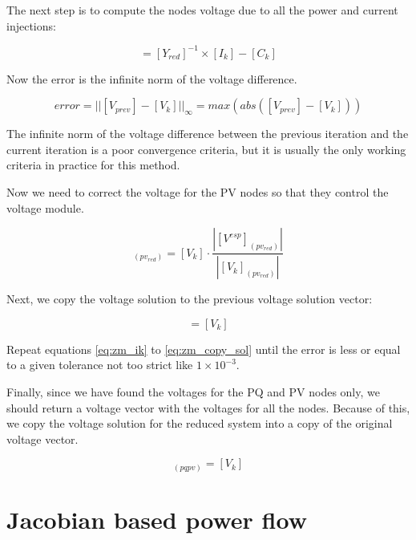 \documentclass[nols,a4paper,twoside,notoc,fleqn]{tufte-book}
\begin{document}
The next step is to compute the nodes voltage due to all the power and current injections:

\begin{equation}
[V_k] = [Y_{red}]^{-1} \times [I_k] - [C_k]
\end{equation}


Now the error is the infinite norm of the voltage difference.

\begin{equation}
error = ||[V_{prev}] - [V_k] ||_{\infty} = max(abs([V_{prev}] - [V_k] ))
\end{equation}

The infinite norm of the voltage difference between the previous iteration and the current iteration is a poor convergence criteria, but it is usually the only working criteria in practice for this method.

Now we need to correct the voltage for the PV nodes so that they control the voltage module.

\begin{equation}
[V_k]_{ (pv_{red})} = [V_k] \cdot \frac{|[V^{esp}]_{(pv_{red})}|}{|[V_k]_{(pv_{red})}|}
\label{eq:zm_pv_correction}
\end{equation}


Next, we copy the voltage solution to the previous voltage solution vector:

\begin{equation}
[V_{prev}] = [V_k]
\label{eq:zm_copy_sol}
\end{equation}

Repeat equations \ref{eq:zm_ik} to \ref{eq:zm_copy_sol} until the error is less or equal to a given tolerance not too strict like $1\times10^{-3}$.

Finally, since we have found the voltages for the PQ and PV nodes only, we should return a voltage vector with the voltages for all the nodes. Because of this, we copy the voltage solution for the reduced system into a copy of the original voltage vector.

\begin{equation}
[V]_{(pqpv)} = [V_k]
\end{equation}


\section{Jacobian based power flow}
\end{document}
